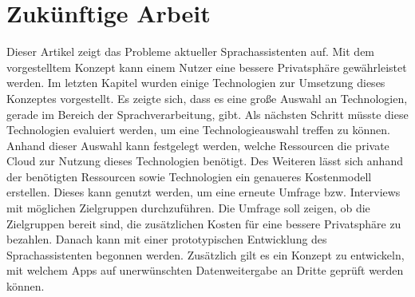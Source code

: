 \section{Zukünftige Arbeit}
Dieser Artikel zeigt das Probleme aktueller Sprachassistenten auf. Mit dem vorgestelltem Konzept kann einem Nutzer eine bessere Privatsphäre gewährleistet werden. Im letzten Kapitel wurden einige Technologien zur Umsetzung dieses Konzeptes vorgestellt. Es zeigte sich, dass es eine große Auswahl an Technologien, gerade im Bereich der Sprachverarbeitung, gibt. Als nächsten Schritt müsste diese Technologien evaluiert werden, um eine Technologieauswahl treffen zu können. Anhand dieser Auswahl kann festgelegt werden, welche Ressourcen die private Cloud zur Nutzung dieses Technologien benötigt. Des Weiteren lässt sich anhand der benötigten Ressourcen sowie Technologien ein genaueres Kostenmodell erstellen. Dieses kann genutzt werden, um eine erneute Umfrage bzw. Interviews mit möglichen Zielgruppen durchzuführen. Die Umfrage soll zeigen, ob die Zielgruppen bereit sind, die zusätzlichen Kosten für eine bessere Privatsphäre zu bezahlen. Danach kann mit einer prototypischen Entwicklung des Sprachassistenten begonnen werden. Zusätzlich gilt es ein Konzept zu entwickeln, mit welchem Apps auf unerwünschten Datenweitergabe an Dritte geprüft werden können. 